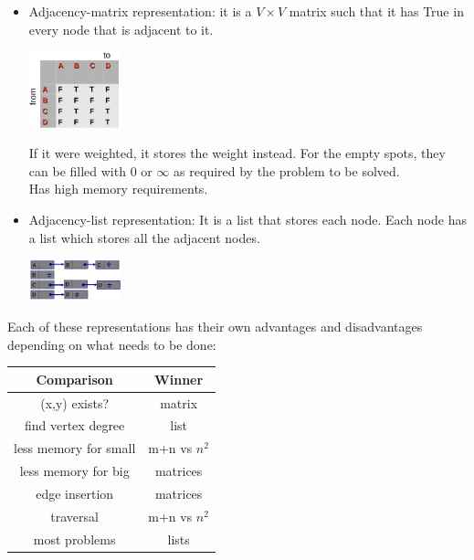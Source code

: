 \documentclass[nobib]{tufte-handout}
\begin{document}
\begin{itemize}
    \item Adjacency-matrix representation: it is a $V\times V$ matrix such that it has
          True in every node that is adjacent to it.\\
          \begin{center}
              \includegraphics[width = 100px]{images/adj_matrix.png}
          \end{center}
          If it were weighted, it stores the weight instead. For the empty spots, they can be filled with $0$ or $\infty$ as required by the problem to be solved.\\
          Has high memory requirements.
    \item Adjacency-list representation: It is a list that stores each node. Each node
          has a list which stores all the adjacent nodes.\\
          \begin{center}
              \includegraphics[width = 100px]{images/adj_ist.png}
          \end{center}
\end{itemize}
Each of these representations has their own advantages and disadvantages depending on what needs to be done:
\begin{table}
    \centering
    \begin{tabular}{|c|c|}
        \hline
        Comparison            & Winner       \\
        \hline
        (x,y) exists?         & matrix       \\
        find vertex degree    & list         \\
        less memory for small & m+n vs $n^2$ \\
        less memory for big   & matrices     \\
        edge insertion        & matrices     \\
        traversal             & m+n vs $n^2$ \\
        most problems         & lists        \\
        \hline
    \end{tabular}
\end{table}
\end{document}

